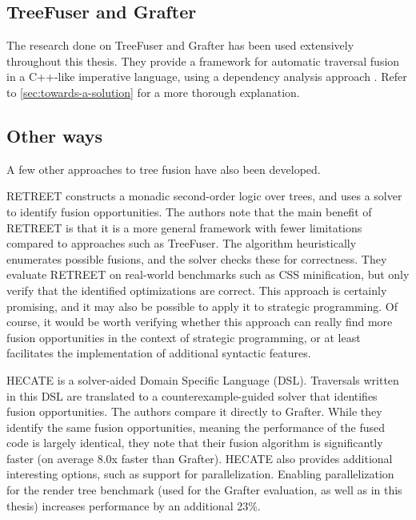 \subsection{TreeFuser and Grafter}
The research done on TreeFuser and Grafter has been used extensively throughout this thesis. They provide a framework for automatic traversal fusion in a C++-like imperative language, using a dependency analysis approach \cite{SakkaS017, SakkaSN019}. Refer to \autoref{sec:towards-a-solution} for a more thorough explanation.

\subsection{Other ways}
A few other approaches to tree fusion have also been developed.

RETREET \cite{WangLZQ21} constructs a monadic second-order logic over trees, and uses a solver to identify fusion opportunities. The authors note that the main benefit of RETREET is that it is a more general framework with fewer limitations compared to approaches such as TreeFuser. The algorithm heuristically enumerates possible fusions, and the solver checks these for correctness. They evaluate RETREET on real-world benchmarks such as CSS minification, but only verify that the identified optimizations are correct. This approach is certainly promising, and it may also be possible to apply it to strategic programming. Of course, it would be worth verifying whether this approach can really find more fusion opportunities in the context of strategic programming, or at least facilitates the implementation of additional syntactic features.

HECATE \cite{ChenLFB22} is a solver-aided Domain Specific Language (DSL). Traversals written in this DSL are translated to a counterexample-guided solver that identifies fusion opportunities. The authors compare it directly to Grafter. While they identify the same fusion opportunities, meaning the performance of the fused code is largely identical, they note that their fusion algorithm is significantly faster (on average 8.0x faster than Grafter). HECATE also provides additional interesting options, such as support for parallelization. Enabling parallelization for the render tree benchmark (used for the Grafter evaluation, as well as in this thesis) increases performance by an additional 23\%.